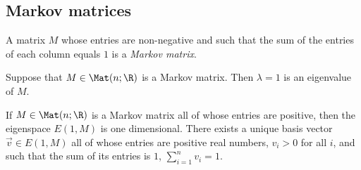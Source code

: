 \documentclass{article}
\begin{document}
\subsection{Markov matrices}

\begin{definition}
    A matrix $M$ whose entries are non-negative and such that the sum of the entries of each 
    column equals $1$ is a \emph{Markov matrix}.
\end{definition}

\begin{lemma}[Notes 4.7.6]
    Suppose that $M\in\Mat(n;\R)$ is a Markov matrix. Then $\lambda=1$ is an eigenvalue of $M$.
\end{lemma}

\begin{theorem}[Perron]
    If $M\in\Mat(n;\R)$ is a Markov matrix all of whose entries are positive, then the eigenspace 
    $E(1,M)$ is one dimensional. There exists a unique basis vector $\vec v\in E(1,M)$ all of whose 
    entries are positive real numbers, $v_i>0$ for all $i$, and such that the sum of its entries is $1$,
    $\sum_{i=1}^n v_i=1$. 
\end{theorem}
\end{document}
